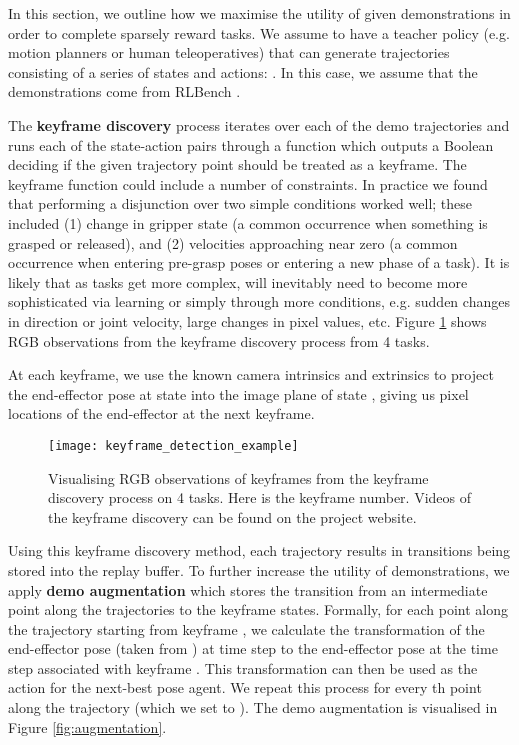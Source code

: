 \documentclass[letterpaper, 10 pt, journal, twoside]{IEEEtran}
\begin{document}
In this section, we outline how we maximise the utility of given demonstrations in order to complete sparsely reward tasks. We assume to have a teacher policy  (e.g. motion planners or human teleoperatives) that can generate trajectories consisting of a series of states and actions: . In this case, we assume that the demonstrations come from RLBench \cite{james2019rlbench}. 

The \textbf{keyframe discovery} process iterates over each of the demo trajectories  and runs each of the state-action pairs  through a function  which outputs a Boolean deciding if the given trajectory point should be treated as a keyframe. The keyframe function  could include a number of constraints. In practice we found that performing a disjunction over two simple conditions worked well; these included (1) change in gripper state (a common occurrence when something is grasped or released), and (2) velocities approaching near zero (a common occurrence when entering pre-grasp poses or entering a new phase of a task). It is likely that as tasks get more complex,  will inevitably need to become more sophisticated via learning or simply through more conditions, e.g. sudden changes in direction or joint velocity, large changes in pixel values, etc. Figure \ref{fig:keyframes} shows RGB observations from the keyframe discovery process from 4 tasks.

At each keyframe, we use the known camera intrinsics and extrinsics to project the end-effector pose at state  into the image plane of state , giving us pixel locations of the end-effector at the next keyframe. 

\begin{figure}
\centering
\texttt{[image: keyframe\_detection\_example]}
\caption{Visualising RGB observations of keyframes from the keyframe discovery process on 4 tasks. Here  is the keyframe number. Videos of the keyframe discovery can be found on the project website.}
\label{fig:keyframes}
\vspace{-15pt}
\end{figure}

Using this keyframe discovery method, each trajectory results in  transitions being stored into the replay buffer. To further increase the utility of demonstrations, we apply \textbf{demo augmentation} which stores the transition from an intermediate point along the trajectories to the keyframe states. Formally, for each point  along the trajectory starting from keyframe , we calculate the transformation of the end-effector pose (taken from ) at time step  to the end-effector pose at the time step associated with keyframe . This transformation can then be used as the action for the next-best pose agent. We repeat this process for every th point along the trajectory (which we set to ). The demo augmentation is visualised in Figure \ref{fig:augmentation}.
\end{document}
